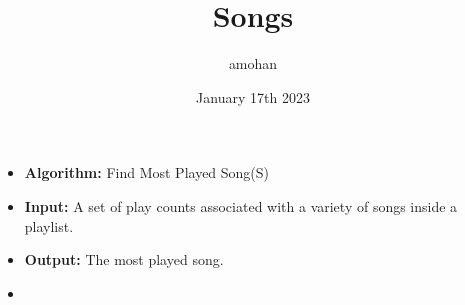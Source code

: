 \documentclass{article}
\title{Songs}
\author{amohan}
\date{January 17th 2023}
\begin{document}
\begin{itemize}
\item[]
\textbf{Algorithm:} Find Most Played Song(S)
\item[]
\textbf{Input:} A set of play counts associated with a variety of songs inside a playlist.
\item[]
\textbf{Output:} The most played song.
\item[]
\end{itemize}
\end{document}
